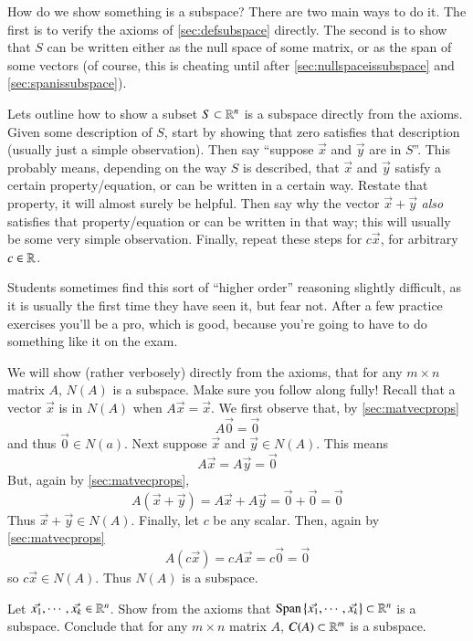 \begin{Remark}
  How do we show something is a subspace?
  There are two main ways to do it.  
  The first is to verify the axioms of   \ref{sec:defsubspace} directly.  The second is to show that $S$ can be written either as the null space of some matrix, or as the span of some vectors (of course, this is cheating until after \ref{sec:nullspaceissubspace} and \ref{sec:spanissubspace}).  
  
  Lets outline how to show a subset $S\subset \mathbb{R}^n$ is a subspace directly from the axioms.  
  Given some description of $S$, start by showing that zero satisfies that description (usually just a simple observation).
  Then say ``suppose $\vec{x}$ and $\vec{y}$ are in $S$''.  
  This probably means, depending on the way $S$ is described, that $\vec{x}$ and $\vec{y}$ satisfy a certain property/equation, or can be written in a certain way.  
  Restate that property, it will almost surely be helpful.
  Then say why the vector $\vec{x}+\vec{y}$ \emph{also} satisfies that property/equation or can be written in that way; this will usually be some very simple observation.  
  Finally, repeat these steps for $c\vec{x}$, for arbitrary $c\in \mathbb{R}$.  

  Students sometimes find this sort of ``higher order'' reasoning slightly difficult, as it is usually the first time they have seen it, but fear not.
  After a few practice exercises you'll be a pro, which is good, because you're going to have to do something like it on the exam.  
\end{Remark}

\begin{Example}
  \label{sec:nullspaceissubspace}
  We will show (rather verbosely) directly from the axioms, that for any $m\times n$ matrix $A$, $N(A)$ is a subspace.
  Make sure you follow along fully!
  Recall that a vector $\vec{x}$ is in $N(A)$ when $A\vec{x}=\vec{x}$.
  We first observe that, by \ref{sec:matvecprops}
  \[A\vec{0}=\vec{0}\]
  and thus $\vec{0}\in N(a)$.
  Next suppose $\vec{x}$ and $\vec{y}\in N(A)$.  This means 
  \[A\vec{x}=A\vec{y}=\vec{0}\]
  But, again by \ref{sec:matvecprops},
  \[A(\vec{x}+\vec{y})=A\vec{x} + A\vec{y}= \vec{0} + \vec{0} = \vec{0}\]
  Thus $\vec{x} + \vec{y} \in N(A)$.  
  Finally, let $c$ be any scalar.
  Then, again by \ref{sec:matvecprops}
  \[A(c\vec{x})=cA\vec{x}= c\vec{0} = \vec{0}\]
  so $c\vec{x}\in N(A)$.  Thus $N(A)$ is a subspace.
\end{Example}

\begin{Ex}
  \label{sec:spanissubspace}
  Let $\vec{x_1},\cdots,\vec{x_k}\in \mathbb{R}^n$.
  Show from the axioms that $\operatorname{Span}\nolimits\left\{\vec{x_1},\cdots,\vec{x_k}\right\}\subset \mathbb{R}^n$ is a subspace.
  Conclude that for any $m\times n$ matrix $A$, $C(A)\subset \mathbb{R}^m$ is a subspace.  
\end{Ex}

